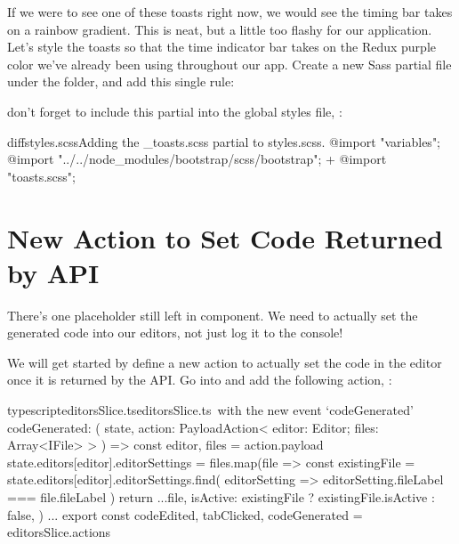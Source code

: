 \documentclass[paper=6in:9in,pagesize=pdftex,headinclude=on,footinclude=on,12pt,twoside]{scrbook}
\begin{document}
If we were to see one of these toasts right now, we would see the timing bar takes on a rainbow gradient. This is neat, but a little too flashy for our application. Let's style the toasts so that the time indicator bar takes on the Redux purple color we've already been using throughout our app. Create a new Sass partial file  under the  folder, and add this single rule:


don't forget to include this partial into the global styles file, :

\begin{codeInput}{diff}{styles.scss}{Adding the \_toasts.scss partial to styles.scss.}
@import "variables";
@import "../../node_modules/bootstrap/scss/bootstrap";
+ @import "toasts.scss";
\end{codeInput}

\section{New Action to Set Code Returned by API}

There's one placeholder  still left in  component. We need to actually set the generated code into our editors, not just log it to the console! 


We will get started by define a new action to actually set the code in the editor once it is returned by the API. Go into  and add the following action, :

\begin{codeInput}{typescript}{editorsSlice.ts}{editorsSlice.ts\, with the new event `codeGenerated'}
codeGenerated: (
  state,
  action: PayloadAction<{ editor: Editor; files: Array<IFile> }>
) => {
  const { editor, files } = action.payload
  state.editors[editor].editorSettings = files.map(file => {
    const existingFile = state.editors[editor].editorSettings.find(
      editorSetting => editorSetting.fileLabel === file.fileLabel
    )
    return {
      ...file,
      isActive: existingFile ? existingFile.isActive : false,
    }
  })
}
...
export const { codeEdited, tabClicked, codeGenerated } = editorsSlice.actions
\end{codeInput}
\end{document}
